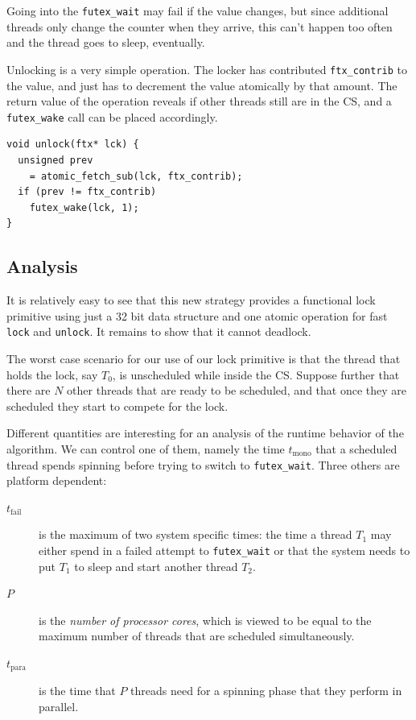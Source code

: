 \documentclass{sig-alternate-05-2015}
\begin{document}
Going into the \texttt{futex\_wait} may fail if the value changes, but
since additional threads only change the counter when they arrive,
this can't happen too often and the thread goes to sleep,
eventually.

Unlocking is a very simple operation. The locker has contributed
\texttt{ftx\_contrib} to the value, and just has to decrement the value
atomically by that amount.  The return value of the operation
reveals if other threads still are in the CS, and a
\texttt{futex\_wake} call can be placed accordingly.

\lstset{language=C11,label= ,caption= ,numbers=none}
\begin{lstlisting}
void unlock(ftx* lck) {
  unsigned prev
    = atomic_fetch_sub(lck, ftx_contrib);
  if (prev != ftx_contrib)
    futex_wake(lck, 1);
}
\end{lstlisting}


\subsection{Analysis}
\label{sec-3-2}

It is relatively easy to see that this new strategy provides a
functional lock primitive using just a 32 bit data structure and
one atomic operation for fast \texttt{lock} and \texttt{unlock}. It remains to
show that it cannot deadlock.

The worst case scenario for our use of our lock primitive is that
the thread that holds the lock, say $T_0$, is unscheduled while
inside the CS. Suppose further that there are $N$ other threads
that are ready to be scheduled, and that once they are scheduled
they start to compete for the lock.

Different quantities are interesting for an analysis of the runtime
behavior of the algorithm. We can control one of them, namely the
time $t_{\textrm{mono}}$ that a scheduled thread spends spinning
before trying to switch to \texttt{futex\_wait}.  Three others are platform
dependent:\vspace*{-1ex}

\begin{description}
\item[{$t_{\textrm{fail}}$}] is the maximum of two system specific
times: the time a thread $T_1$ may either spend in a failed
attempt to \texttt{futex\_wait} or that the system needs to put $T_1$
to sleep and start another thread $T_2$.\vspace*{-1ex}

\item[{$P$}] is the \emph{number of processor cores}, which is viewed to be
equal to the maximum number of threads that are scheduled
simultaneously.\vspace*{-1ex}

\item[{$t_{\textrm{para}}$}] is the time that $P$ threads need for a
spinning phase that they perform in parallel.\vspace*{-1ex}
\end{description}
\end{document}
